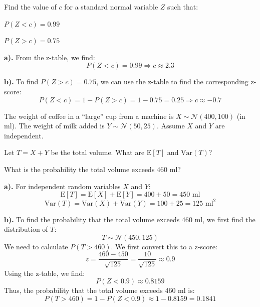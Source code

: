 \documentclass[a4paper, 10pt]{article}
\begin{document}
\begin{problem}
Find the value of \( c \) for a standard normal variable \( Z \) such that:
\begin{subproblems}
    \item \( P(Z < c) = 0.99 \)
    \item \( P(Z > c) = 0.75 \)
\end{subproblems}
\end{problem}

\begin{solution}
\textbf{a).} From the z-table, we find:
\[ P(Z < c) = 0.99 \Rightarrow c \approx \boxed{2.3} \]

\textbf{b).} To find \( P(Z > c) = 0.75 \), we can use the z-table to find the corresponding z-score:
\[ P(Z < c) = 1 - P(Z > c) = 1 - 0.75 = 0.25 \Rightarrow c \approx \boxed{-0.7} \]
\end{solution}

\newpage

\begin{problem}
The weight of coffee in a ``large'' cup from a machine is \( X \sim \mathcal{N}(400, 100) \) (in ml).
The weight of milk added is \( Y \sim \mathcal{N}(50, 25) \). Assume \( X \) and \( Y \) are independent.
\begin{subproblems}
    \item Let \( T = X + Y \) be the total volume. What are \( \text{E}[T] \) and \( \text{Var}(T) \)?
    \item  What is the probability the total volume exceeds 460 ml?
\end{subproblems}
\end{problem}

\begin{solution}
\textbf{a).} For independent random variables \( X \) and \( Y \):
\[ \text{E}[T] = \text{E}[X] + \text{E}[Y] = 400 + 50 = \boxed{450 \text{ ml}} \]
\[ \text{Var}(T) = \text{Var}(X) + \text{Var}(Y) = 100 + 25 = \boxed{125 \text{ ml}^2} \]

\textbf{b).} To find the probability that the total volume exceeds 460 ml, we first find the distribution of \( T \):
\[ T \sim \mathcal{N}(450, 125) \]
We need to calculate \( P(T > 460) \). We first convert this to a z-score:
\[ z = \frac{460 - 450}{\sqrt{125}} = \frac{10}{\sqrt{125}} \approx 0.9 \]
Using the z-table, we find:
\[ P(Z < 0.9) \approx 0.8159 \]
Thus, the probability that the total volume exceeds 460 ml is:
\[ P(T > 460) = 1 - P(Z < 0.9) \approx 1 - 0.8159 = \boxed{0.1841} \]
\end{solution}
\end{document}
